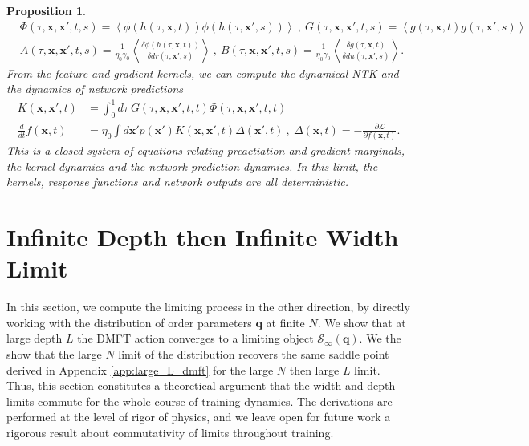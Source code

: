 \documentclass{article} %
\def\x{\bm x}
\newtheorem{proposition}{Proposition}
\begin{document}
\begin{proposition}
\begin{align}
    &\Phi(\tau,\x,\x',t,s) = \left< \phi(h(\tau,\x,t)) \phi(h(\tau,\x',s))  \right> \ , \ G(\tau,\x,\x',t,s) = \left< g(\tau,\x,t) g(\tau,\x',s) \right> \nonumber
    \\
     &A(\tau,\x,\x',t,s) = \frac{1}{\eta_0 \gamma_0} \left< \frac{\delta \phi(h(\tau,\x,t))}{\delta dr(\tau,\x',s)} \right> \ , \ B(\tau,\x,\x',t,s) = \frac{1}{\eta_0 \gamma_0} \left< \frac{\delta g(\tau,\x,t)}{\delta du(\tau,\x',s)} \right> .
\end{align}
From the feature and gradient kernels, we can compute the dynamical NTK and the dynamics of network predictions
\begin{align}
    K(\x,\x',t) &= \int_0^1 d\tau \ G(\tau,\x,\x',t,t) \Phi(\tau,\x,\x',t,t) \nonumber
    \\
    \frac{d}{dt} f(\x,t) &= \eta_0 \int d\x' p(\x') K(\x,\x',t) \Delta(\x',t) \ , \ \Delta(\x,t) = - \frac{\partial \mathcal L}{\partial f(\x,t)} .
\end{align}
This is a closed system of equations relating preactiation and gradient marginals, the kernel dynamics and the network prediction dynamics. In this limit, the kernels, response functions and network outputs are all deterministic. 
\end{proposition}


\section{Infinite Depth then Infinite Width Limit}\label{app:depth_first_then_width}

In this section, we compute the limiting process in the other direction, by directly working with the distribution of order parameters $\bm q$ at finite $N$. We show that at large depth $L$ the DMFT action converges to a limiting object $\mathcal{S}_\infty(\bm q)$. We the show that the large $N$ limit of the distribution recovers the same saddle point derived in Appendix \ref{app:large_L_dmft} for the large $N$ then large $L$ limit. Thus, this section constitutes a theoretical argument that the width and depth limits commute for the whole course of training dynamics. The derivations are performed at the level of rigor of physics, and we leave open for future work a rigorous result about commutativity of limits throughout training. 
\end{document}
